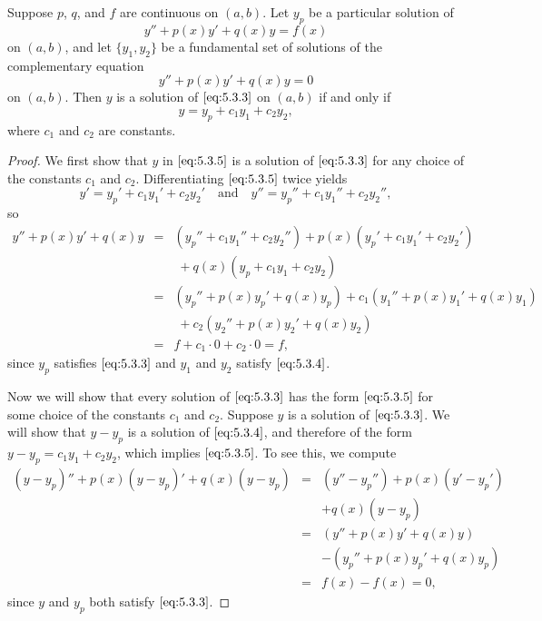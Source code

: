 \documentclass{ximera}
\begin{document}
\begin{theorem}\label{thmtype:5.3.2}
Suppose $p$, $q$, and $f$ are continuous on $(a,b)$. Let $y_p$
be a particular solution of
\begin{equation} \label{eq:5.3.3}
y''+p(x)y'+q(x)y=f(x)
\end{equation}
on $(a,b)$, and let  $\{y_1,y_2\}$ be a fundamental set of solutions
of the complementary equation
\begin{equation} \label{eq:5.3.4}
y''+p(x)y'+q(x)y=0
\end{equation}
on $(a,b)$.
Then $y$ is a solution of  $\eqref{eq:5.3.3}$ on $(a,b)$ if and  only if
\begin{equation} \label{eq:5.3.5}
y=y_p+c_1y_1+c_2y_2,
\end{equation}
where $c_1$ and $c_2$  are constants.
\end{theorem}
 
\begin{proof} We first show that $y$ in $\eqref{eq:5.3.5}$ is a solution of
$\eqref{eq:5.3.3}$ for any choice of the constants $c_1$ and $c_2$.
Differentiating $\eqref{eq:5.3.5}$ twice yields
$$
y'=y_p'+c_1y_1'+c_2y_2'\quad\mbox{and}\quad
y''=y_p''+ c_1y_1''+c_2y_2'',
$$
so
\begin{eqnarray*}
y''+p(x)y'+q(x)y&=&(y_p''+c_1y_1''+c_2y_2'')
+p(x)(y_p'+c_1y_1'+c_2y_2')\\&&\; +q(x)(y_p+c_1y_1+c_2y_2)\\
&=&(y_p''+p(x)y_p'+q(x)y_p)+c_1(y_1''+p(x)y_1'+q(x)y_1)\\
&&\; +c_2(y_2''+p(x)y_2'+q(x)y_2)\\
&=& f+c_1\cdot0+c_2\cdot 0=f,
\end{eqnarray*}
since $y_p$ satisfies $\eqref{eq:5.3.3}$ and $y_1$ and $y_2$ satisfy
$\eqref{eq:5.3.4}$.
 
Now we will show that every solution of $\eqref{eq:5.3.3}$ has the form
$\eqref{eq:5.3.5}$ for some choice of the constants $c_1$ and $c_2$.
Suppose $y$ is a solution of $\eqref{eq:5.3.3}$. We will show that
$y-y_p$ is a solution of $\eqref{eq:5.3.4}$, and therefore of the form
$y-y_p=c_1y_1+c_2y_2$, which implies $\eqref{eq:5.3.5}$. To see this, we
compute
\begin{eqnarray*}
(y-y_p)''+p(x)(y-y_p)'+q(x)(y-y_p)&=&(y''-y_p'')+p(x)(y'-y_p')\\ &&
+q(x)(y-y_p)\\
&=&(y''+p(x)y'+q(x)y)\\ && -(y_p''+p(x)y_p'+q(x)y_p)\\
&=&f(x)-f(x)=0,
\end{eqnarray*}
since $y$ and $y_p$ both satisfy $\eqref{eq:5.3.3}$.
\end{proof}
 
\end{document}
